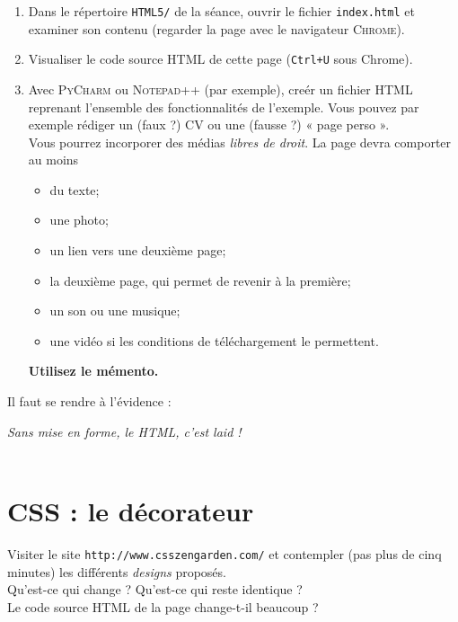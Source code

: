 \begin{exercice}
	\begin{enumerate}
		\item 	Dans le répertoire \texttt{\textsc{HTML}5/} de la séance, ouvrir le fichier \texttt{index.html} et examiner son contenu (regarder la page 
		avec le 
		navigateur \textsc{Chrome}).
		\item 	Visualiser le code source \textsc{HTML} de cette page (\texttt{Ctrl+U} sous Chrome).
		\item 	Avec \textsc{PyCharm} ou \textsc{Notepad++} (par exemple), creér un fichier \textsc{HTML} reprenant l'ensemble des fonctionnalités de l'exemple. 
				Vous pouvez par exemple rédiger un (faux ?) CV ou une (fausse ?) « page perso ».\\
				Vous pourrez incorporer des médias \textit{libres de droit}. La page devra comporter au moins 
				\begin{itemize}
				\item 	du texte;
				\item 	une photo;
				\item 	un lien vers une deuxième page;
				\item	la deuxième page, qui permet de revenir à la première;
				\item 	un son ou une musique;
				\item 	une vidéo si les conditions de téléchargement le permettent.
				\end{itemize}
		\textbf{Utilisez le mémento.}
	\end{enumerate}
	Il faut se rendre à l'évidence :
	\begin{center}
	\textit{Sans mise en forme, le \textsc{HTML}, c'est laid !\\ \ }\\
	\end{center}
\end{exercice}
	
\section{CSS : le décorateur}

	\begin{exercice}
Visiter le site \texttt{http://www.csszengarden.com/} et contempler (pas plus de cinq minutes) les différents \textit{designs} proposés.\\
Qu'est-ce qui change ? Qu'est-ce qui reste identique ?\\
Le code source \textsc{HTML} de la page change-t-il beaucoup ?
\end{exercice}
	
